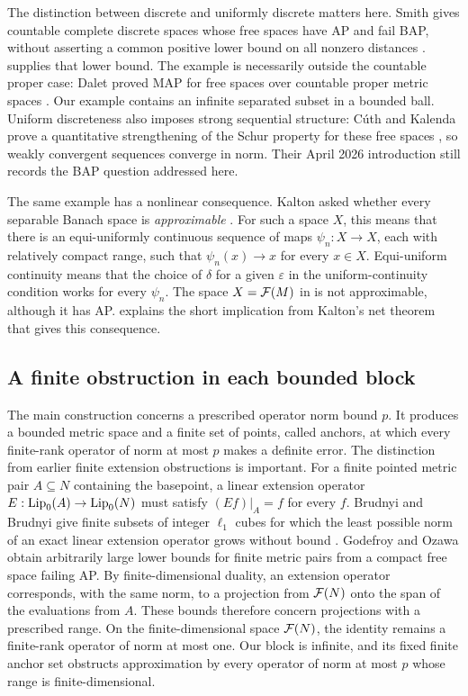 The distinction between discrete and uniformly discrete matters here.
Smith gives countable complete discrete spaces whose free spaces have AP
and fail BAP, without asserting a common positive lower bound on all
nonzero distances \cite[Theorem~1.3 and the surrounding discussion]{Smith26}.
supplies that lower bound. The example is necessarily outside the countable
proper case: Dalet proved MAP for free spaces over countable proper metric
spaces \cite[Theorem~2.6]{Dalet15}. Our example contains an infinite separated
subset in a bounded ball.
Uniform discreteness also imposes strong sequential structure: C\'uth and
Kalenda prove a quantitative strengthening of the Schur property for these
free spaces \cite[Theorem~1.1]{CuthKalenda26}, so weakly convergent sequences
converge in norm. Their April 2026 introduction still records the BAP
question addressed here.

The same example has a nonlinear consequence. Kalton asked whether every
separable Banach space is \emph{approximable} \cite[Problem~1, p.~1260]{Kalton12}.
For such a space $X$, this means that there is an equi-uniformly continuous
sequence of maps $\psi_n:X\to X$, each with relatively compact range, such
that $\psi_n(x)\to x$ for every $x\in X$. Equi-uniform continuity means that
the choice of $\delta$ for a given $\varepsilon$ in the uniform-continuity
condition works for every $\psi_n$. The space $X=\mathcal F(M)$ in 
is not approximable, although it has AP.  explains the
short implication from Kalton's net theorem that gives this consequence.

\subsection{A finite obstruction in each bounded block}

The main construction concerns a prescribed operator norm bound $p$.
It produces a bounded metric space and a finite set of points, called
anchors, at which every finite-rank operator of norm at most $p$ makes a
definite error. The distinction from earlier finite extension obstructions
is important. For a finite pointed metric pair $A\subseteq N$ containing
the basepoint, a linear extension operator
$E:\operatorname{Lip}_0(A)\to\operatorname{Lip}_0(N)$ must satisfy $(Ef)|_A=f$ for every $f$.
Brudnyi and Brudnyi give finite subsets of integer $\ell_1$ cubes for which
the least possible norm of an exact linear extension operator grows without bound
\cite[preprint Lemma~10.5, pp.~46--47]{BrudnyiBrudnyi07}. Godefroy and Ozawa
\cite[Proposition~7]{GodefroyOzawa14} obtain arbitrarily large lower bounds for
finite metric pairs from a compact free space failing AP. By
finite-dimensional duality, an extension operator corresponds, with the
same norm, to a projection from $\mathcal F(N)$ onto the span of the evaluations
from $A$. These bounds therefore concern projections with a prescribed
range. On the finite-dimensional space $\mathcal F(N)$, the identity remains a
finite-rank operator of norm at most one. Our block is infinite, and its
fixed finite anchor set obstructs approximation by every operator of norm
at most $p$ whose range is finite-dimensional.

